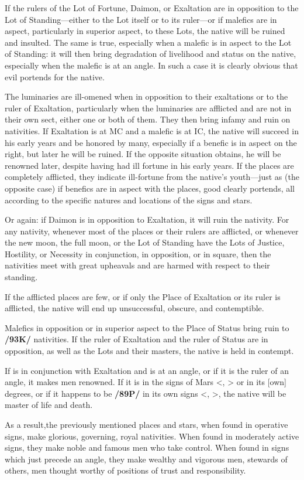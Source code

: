 If the rulers of the Lot of Fortune, Daimon, or Exaltation are in opposition to the Lot of Standing—either to the Lot itself or to its ruler—or if malefics are in aspect, particularly in superior aspect, to these Lots, the native will be ruined and insulted. The same is true, especially when a malefic is in
aspect to the Lot of Standing: it will then bring degradation of livelihood and status on the native, especially when the malefic is at an angle. In such a case it is clearly obvious that evil portends for the native.

The luminaries are ill-omened when in opposition to their exaltations or to the ruler of Exaltation, particularly when the luminaries are afflicted and are not in their own sect, either one or both of them. They then bring infamy and ruin on nativities. If Exaltation is at MC and a malefic is at IC, the native will succeed in his early years and be honored by many, especially if a benefic is in aspect on the right, but later he will be ruined. If the opposite situation obtains, he will be renowned later, despite having had ill fortune in his early years. If the places are completely afflicted, they indicate ill-fortune from the native’s youth—just as (the opposite case) if benefics are in aspect with the places, good clearly portends, all according to the specific natures and locations of the signs and stars.

Or again: if Daimon is in opposition to Exaltation, it will ruin the nativity. For any nativity, whenever most of the places or their rulers are afflicted, or whenever the new moon, the full moon, or the Lot of Standing have the Lots of Justice, Hostility, or Necessity in conjunction, in opposition, or in
square, then the nativities meet with great upheavals and are harmed with respect to their standing. 

If the afflicted places are few, or if only the Place of Exaltation or its ruler is afflicted, the native will end up unsuccessful, obscure, and contemptible. 

Malefics in opposition or in superior aspect to the Place of Status bring ruin to \textbf{/93K/} nativities. If the ruler of Exaltation and the ruler of Status are in opposition, as well as the Lots and their masters, the native is held in contempt. 

If \Jupiter\xspace is in conjunction with Exaltation and
is at an angle, or if it is the ruler of an angle, it makes men renowned. If it is in the signs of Mars <\Scorpio, \Aries> or in its [own] degrees, or if it happens to be \textbf{/89P/} in its own signs <\Sagittarius, \Pisces>, the native will be master of life and death.

As a result,\mndl the previously mentioned places and stars, when found in operative signs, make glorious, governing, royal nativities. When found in moderately active signs, they make noble and famous men who take control. When found in signs which just precede an angle, they make wealthy and vigorous men, stewards of others, men thought worthy of positions of trust and responsibility.

\newpage